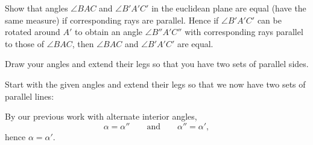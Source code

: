 \documentclass[newpage,hints,handout,noauthor,nooutcomes,12pt]{ximera}
\begin{document}
\begin{problem}
Show that angles $\angle BAC$ and $\angle B'A'C'$ in the
  euclidean plane are equal (have the same measure) if corresponding
  rays are parallel. Hence if $\angle B'A'C'$ can be rotated around
  $A'$ to obtain an angle $\angle B''A'C''$ with corresponding rays
  parallel to those of $\angle BAC$, then $\angle BAC$ and $\angle
  B'A'C'$ are equal.

\begin{hint}
Draw your angles and extend their legs so that you have two sets of
parallel sides.
\end{hint}
\begin{freeResponse}
Start with the given angles and extend their legs so that we now have two sets of parallel lines:
\begin{image}
\end{image}
By our previous work with alternate interior angles,
\[
\alpha = \alpha'' \qquad\text{and}\qquad \alpha'' = \alpha',
\]
hence $\alpha = \alpha'$.
\end{freeResponse}
\end{problem}
\end{document}
